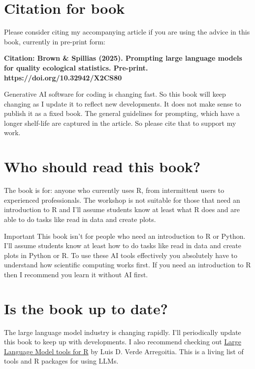 \documentclass[
  letterpaper,
  DIV=11,
  numbers=noendperiod]{scrreprt}
\begin{document}
\section{Citation for book}\label{citation-for-book}

Please consider citing my accompanying article if you are using the
advice in this book, currently in pre-print form:

\textbf{Citation: Brown \& Spillias (2025). Prompting large language
models for quality ecological statistics. Pre-print.
https://doi.org/10.32942/X2CS80}

Generative AI software for coding is changing fast. So this book will
keep changing as I update it to reflect new developments. It does not
make sense to publish it as a fixed book. The general guidelines for
prompting, which have a longer shelf-life are captured in the article.
So please cite that to support my work.

\section{Who should read this book?}\label{who-should-read-this-book}

The book is for: anyone who currently uses R, from intermittent users to
experienced professionals. The workshop is not suitable for those that
need an introduction to R and I'll assume students know at least what R
does and are able to do tasks like read in data and create plots.

Important This book isn't for people who need an introduction to R or
Python. I'll assume students know at least how to do tasks like read in
data and create plots in Python or R. To use these AI tools effectively
you absolutely have to understand how scientific computing works first.
If you need an introduction to R then I recommend you learn it without
AI first.

\section{Is the book up to date?}\label{is-the-book-up-to-date}

The large language model industry is changing rapidly. I'll periodically
update this book to keep up with developments. I also recommend checking
out \href{https://luisdva.github.io/llmsr-book/before-start.html}{Large
Language Model tools for R} by Luis D. Verde Arregoitia. This is a
living list of tools and R packages for using LLMs.
\end{document}
